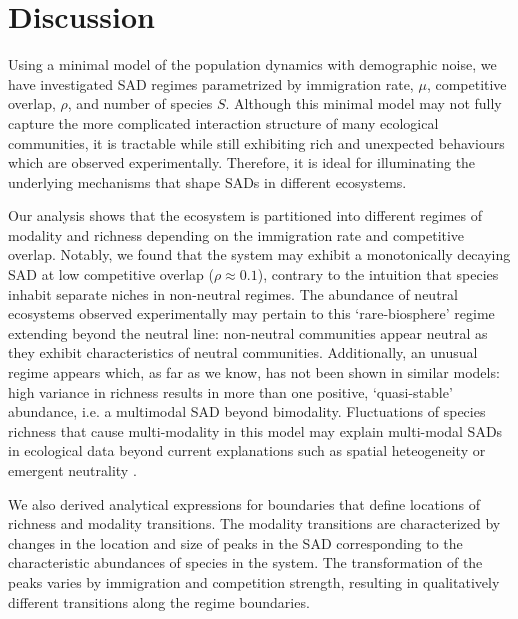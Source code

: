 \documentclass[9pt,twocolumn,twoside,lineno]{pnas-new}
\begin{document}
\section{Discussion}



Using a minimal model of the population dynamics with demographic noise, we have investigated SAD regimes parametrized by immigration rate, $\mu$, competitive overlap, $\rho$, and number of species $S$.
Although this minimal model may not fully capture the more complicated interaction structure of many ecological communities, it is tractable while still exhibiting rich and unexpected behaviours which are observed experimentally.
Therefore, it is ideal for illuminating the underlying mechanisms that shape SADs in different ecosystems.

Our analysis shows that the ecosystem is partitioned into different regimes of modality and richness depending on the immigration rate and competitive overlap.
Notably, we found that the system may exhibit a monotonically decaying SAD at low competitive overlap ($\rho \approx 0.1$), contrary to the intuition that species inhabit separate niches in non-neutral regimes.
The abundance of neutral ecosystems observed experimentally may pertain to this `rare-biosphere' regime extending beyond the neutral line: non-neutral communities appear neutral as they exhibit characteristics of neutral communities.
Additionally, an unusual regime appears which, as far as we know, has not been shown in similar models: high variance in richness results in more than one positive, `quasi-stable' abundance, i.e. a multimodal SAD beyond bimodality.
Fluctuations of species richness that cause multi-modality in this model may explain multi-modal SADs in ecological data beyond current explanations such as spatial heteogeneity or emergent neutrality \cite{dornelas2008multiple,vergnon2012emergent}.

We also derived analytical expressions for boundaries that define locations of richness and modality transitions.
The modality transitions are characterized by changes in the location and size of peaks in the SAD corresponding to the characteristic abundances of species in the system.
The transformation of the peaks varies by immigration and competition strength, resulting in qualitatively different transitions along the regime boundaries.
\end{document}
